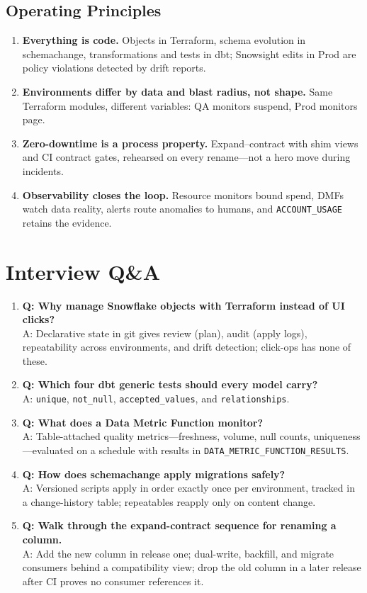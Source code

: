 \subsection{Operating Principles}
\begin{enumerate}
    \item \textbf{Everything is code.} Objects in Terraform, schema evolution in schemachange, transformations and tests in dbt; Snowsight edits in Prod are policy violations detected by drift reports.
    \item \textbf{Environments differ by data and blast radius, not shape.} Same Terraform modules, different variables: QA monitors suspend, Prod monitors page.
    \item \textbf{Zero-downtime is a process property.} Expand--contract with shim views and CI contract gates, rehearsed on every rename---not a hero move during incidents.
    \item \textbf{Observability closes the loop.} Resource monitors bound spend, DMFs watch data reality, alerts route anomalies to humans, and \texttt{ACCOUNT\_USAGE} retains the evidence.
\end{enumerate}

\section{Interview Q\&A}
\begin{enumerate}
    \item \textbf{Q: Why manage Snowflake objects with Terraform instead of UI clicks?}\\
    A: Declarative state in git gives review (plan), audit (apply logs), repeatability across environments, and drift detection; click-ops has none of these.
    \item \textbf{Q: Which four dbt generic tests should every model carry?}\\
    A: \texttt{unique}, \texttt{not\_null}, \texttt{accepted\_values}, and \texttt{relationships}.
    \item \textbf{Q: What does a Data Metric Function monitor?}\\
    A: Table-attached quality metrics---freshness, volume, null counts, uniqueness---evaluated on a schedule with results in \texttt{DATA\_METRIC\_FUNCTION\_RESULTS}.
    \item \textbf{Q: How does schemachange apply migrations safely?}\\
    A: Versioned scripts apply in order exactly once per environment, tracked in a change-history table; repeatables reapply only on content change.
    \item \textbf{Q: Walk through the expand-contract sequence for renaming a column.}\\
    A: Add the new column in release one; dual-write, backfill, and migrate consumers behind a compatibility view; drop the old column in a later release after CI proves no consumer references it.
\end{enumerate}

